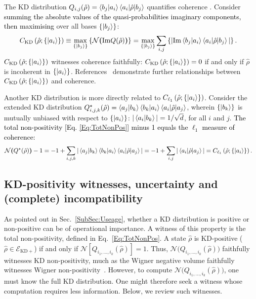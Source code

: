 \documentclass[%
 reprint,
superscriptaddress,
nofootinbib,
bibnotes,
 amsmath,amssymb,
 aps,
]{revtex4-1}
\theoremstyle{plain}
\newcommand{\nicole}[1]{\textcolor{black}{#1} }
\newcommand{\EcalKDC}{{\mathcal E}_{\mathrm{KD+}}}
\renewcommand{\Im}[1]{\mathrm{Im}#1}
\newcommand{\LParen}{ \bm{(} }
\newcommand{\RParen}{ \bm{)} }
\begin{document}
The KD distribution $Q_{i,j} (\hat{\rho}) = \braket{b_j|a_i}\braket{a_i|\hat{\rho}|b_j}$ quantifies coherence  \cite{Budiyono23, budiyono2023characterizing, Budiyono_2023}.  Consider \nicole{summing the absolute values of the quasi-probabilities imaginary components, then maximising}
over all bases $\{\ket{b_j}\}$:
\begin{equation}
C_{\mathrm{KD}} \left( \hat{\rho}; \{ \ket{a_i} \}\right)  
\equiv \max_{\{\ket{b_j}\}}  
\left\{ \mathcal{N} \LParen  \Im Q (\hat{\rho}) \RParen  \right\} 
= \max_{\{\ket{b_j}\}} \sum_{i,j} 
\left\{  | \Im   \braket{b_j|a_i}\braket{a_i|\hat{\rho}|b_j} |  \right\} .
\end{equation}
$C_{\mathrm{KD}} \left( \hat{\rho}; \{ \ket{a_i} \}\right)$ witnesses coherence faithfully: $C_{\mathrm{KD}} \left( \hat{\rho}; \{ \ket{a_i} \}\right) = 0$ if and only if $\hat{\rho}$ is incoherent in $\{ \ket{a_i}\}$. References~\cite{Budiyono23, budiyono2023characterizing, Budiyono_2023} demonstrate further relationships between  $C_{\mathrm{KD}} \left( \hat{\rho}; \{ \ket{a_i} \}\right)$ and coherence. 

Another KD distribution is more directly related to $C_{\ell_1} \left( \hat{\rho}; \{ \ket{a_i} \}\right)$. Consider the extended KD distribution $Q^{\star}_{i,j,k}(\hat{\rho}) = \braket{a_j|b_k} \braket{b_k|a_i}\braket{a_i|\hat{\rho}|a_j}$, wherein $\{ \ket{b_k}\}$ is mutually unbiased with respect to $\{ \ket{a_i} \}$: $|\braket{a_i|b_k}|=1/\sqrt{d}$, for all $i$ and $j$.  
\nicole{The total non-positivity [Eq. \eqref{Eq:TotNonPos}] minus 1 equals the $\ell_1$ measure of coherence:}
\begin{equation}
\mathcal{N} \LParen Q^{\star}(\hat{\rho}) \RParen -1 
= -1 + \sum_{i,j,k} |  \braket{a_j|b_k} \braket{b_k|a_i}\braket{a_i|\hat{\rho}|a_j} | =  -1 + \sum_{i,j} | \braket{a_i|\hat{\rho}|a_j} | = C_{\ell_1} \left( \hat{\rho}; \{ \ket{a_i} \}\right) .
\end{equation}

\subsection{KD-positivity witnesses, uncertainty and (complete) incompatibility}
\label{subsec:KDposwitn}

As pointed out in Sec.~\ref{SubSec:Useage}, whether a KD distribution is positive or non-positive can be of operational importance.  A witness of this property is the total non-positivity, defined in Eq.~\eqref{Eq:TotNonPos}.
A state  $\hat{\rho} $ is KD-positive ($\hat{\rho} \in \EcalKDC$) if and only if $\mathcal{N} \left[ Q_{i_1,\ldots,i_k} (\hat{\rho}) \right]=1$. Thus,  
$\mathcal{N} \LParen Q_{i_1,\ldots,i_k} (\hat{\rho})  \RParen $ 
faithfully witnesses KD non-positivity, much as the Wigner negative volume 
faithfully witnesses Wigner non-positivity~\cite{kenfackzyczkowski2004}. However, to compute $\mathcal{N} \LParen Q_{i_1,\ldots,i_k} (\hat{\rho})  \RParen $, one must know the full KD distribution. One 
might therefore seek a witness whose computation requires less information.  Below, we review such witnesses.
\end{document}
